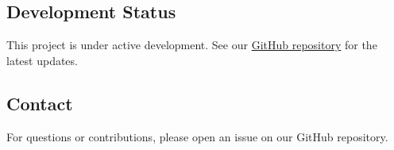 \documentclass[
  11pt,
  a4paper,
]{article}
\begin{document}
\subsection{Development Status}\label{development-status}

This project is under active development. See our
\href{https://github.com/RK0429/ModernMath}{GitHub repository} for the
latest updates.

\subsection{Contact}\label{contact}

For questions or contributions, please open an issue on our GitHub
repository.
\end{document}

